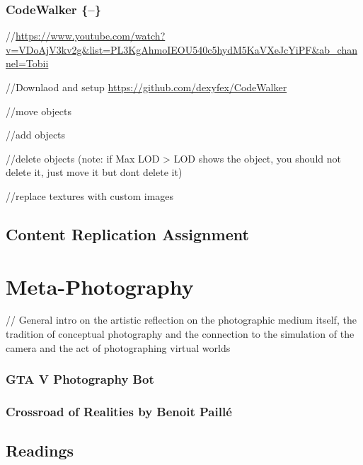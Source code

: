 \documentclass[
  openany]{book}
\begin{document}
\hypertarget{codewalker}{%
\subsection{CodeWalker \{--\}}\label{codewalker}}

//\url{https://www.youtube.com/watch?v=VDoAjV3kv2g\&list=PL3KgAhmoIEOU540c5hydM5KaVXeJcYiPF\&ab_channel=Tobii}

//Downlaod and setup \url{https://github.com/dexyfex/CodeWalker}

//move objects

//add objects

//delete objects (note: if Max LOD \textgreater{} LOD shows the object, you should not delete it, just move it but dont delete it)

//replace textures with custom images

\hypertarget{content-replication-assignment-6}{%
\section{Content Replication Assignment}\label{content-replication-assignment-6}}

\hypertarget{meta-photography}{%
\chapter{Meta-Photography}\label{meta-photography}}

// General intro on the artistic reflection on the photographic medium itself, the tradition of conceptual photography and the connection to the simulation of the camera and the act of photographing virtual worlds

\hypertarget{gta-v-photography-bot}{%
\subsection*{GTA V Photography Bot}\label{gta-v-photography-bot}}

\hypertarget{crossroad-of-realities-by-benoit-pailluxe9}{%
\subsection*{Crossroad of Realities by Benoit Paillé}\label{crossroad-of-realities-by-benoit-pailluxe9}}

\hypertarget{readings-7}{%
\section*{Readings}\label{readings-7}}
\end{document}
